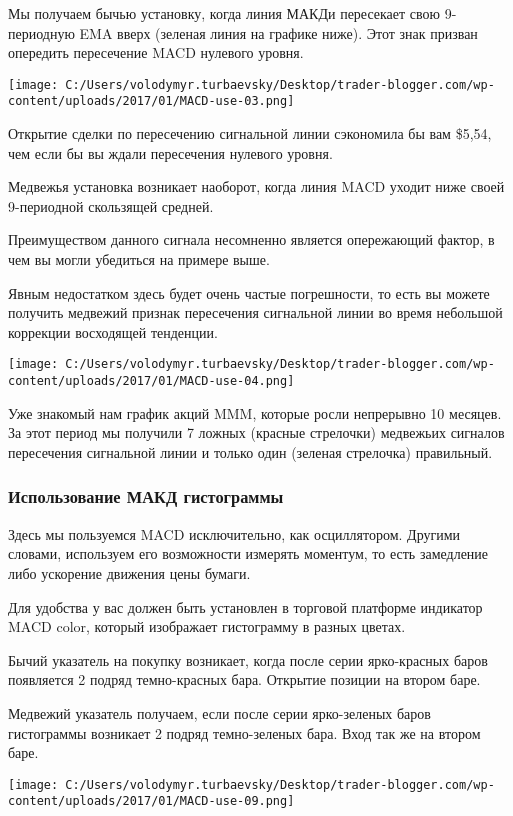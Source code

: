 \documentclass[a5paper]{article}
\begin{document}
Мы получаем бычью установку, когда линия МАКДи пересекает свою
9-периодную EMA вверх (зеленая линия на графике ниже). Этот знак
призван опередить пересечение MACD нулевого уровня.

\texttt{[image: C:/Users/volodymyr.turbaevsky/Desktop/trader-blogger.com/wp-content/uploads/2017/01/MACD-use-03.png]}

Открытие сделки по пересечению сигнальной линии сэкономила бы вам \$5,54, чем если бы вы ждали пересечения нулевого уровня.

Медвежья установка возникает наоборот, когда линия MACD уходит ниже своей 9-периодной скользящей средней.

Преимуществом данного сигнала несомненно является опережающий фактор, в чем вы могли убедиться на примере выше.

Явным недостатком здесь будет очень частые погрешности, то есть вы
можете получить медвежий признак пересечения сигнальной линии во время
небольшой коррекции восходящей тенденции.

\texttt{[image: C:/Users/volodymyr.turbaevsky/Desktop/trader-blogger.com/wp-content/uploads/2017/01/MACD-use-04.png]}

Уже знакомый нам график акций MMM, которые росли непрерывно 10
месяцев. За этот период мы получили 7 ложных (красные стрелочки)
медвежьих сигналов пересечения сигнальной линии и только один (зеленая
стрелочка) правильный.

\subsubsection{Использование МАКД гистограммы}

Здесь мы пользуемся MACD исключительно, как осциллятором. Другими словами, используем его возможности измерять моментум, то есть замедление либо ускорение движения цены бумаги.

Для удобства у вас должен быть установлен в торговой платформе индикатор MACD color, который изображает гистограмму в разных цветах.

Бычий указатель на покупку возникает, когда после серии ярко-красных баров появляется 2 подряд темно-красных бара. Открытие позиции на втором баре.

Медвежий указатель получаем, если после серии ярко-зеленых баров
гистограммы возникает 2 подряд темно-зеленых бара. Вход так же на
втором баре.

\texttt{[image: C:/Users/volodymyr.turbaevsky/Desktop/trader-blogger.com/wp-content/uploads/2017/01/MACD-use-09.png]}
\end{document}
